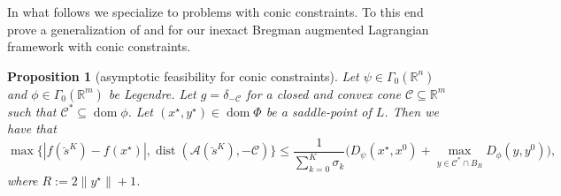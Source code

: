 \documentclass[11pt,onecolumn]{article}
\DeclareMathOperator{\dom}{dom}
\DeclareMathOperator{\dist}{dist}
\newcommand{\bR}{\mathbb{R}}
\newcommand{\cC}{\mathcal{C}}
\newtheorem{proposition}[proposition]{Proposition}
\theoremstyle{remark}
\begin{document}
In what follows we specialize to problems with conic constraints. To this end prove a generalization of \cite[Theorem 4]{xu2021iteration} and \cite[Theorem 3.1]{yan2020bregman} for our inexact Bregman augmented Lagrangian framework with conic constraints.
\begin{proposition}[asymptotic feasibility for conic constraints]
Let $\psi \in \Gamma_0(\bR^n)$ and $\phi \in \Gamma_0(\bR^m)$ be Legendre. Let $g=\delta_{-\cC}$ for a closed and convex cone $\mathcal{C} \subseteq \bR^m$ such that $\cC^* \subseteq \dom \phi$. Let $(x^\star, y^\star) \in \dom \Phi$ be a saddle-point of $L$.
Then we have that
$$
\max\{|f(\breve s^K) - f(x^\star)|, \dist(\mathcal{A}(\breve s^K), -\cC)\} \leq \frac{1}{\sum_{k=0}^{K} \sigma_k} \big(D_\psi(x^\star,x^0) + \max_{y \in \cC^* \cap B_R} D_\phi(y, y^0)\big),
$$
where $R:=2\|y^\star\| + 1$.
\end{proposition}
\end{document}
